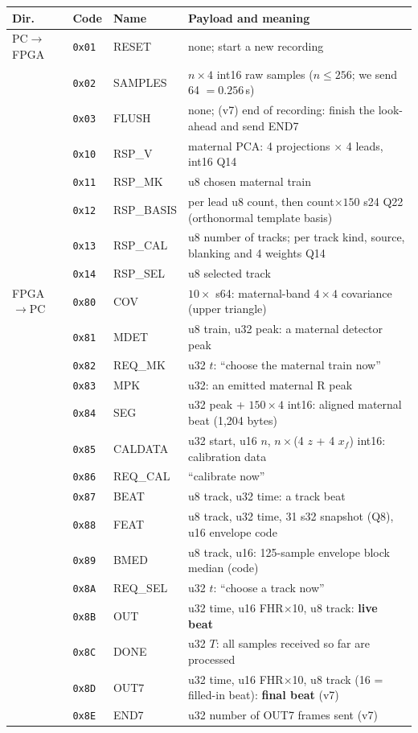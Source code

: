\documentclass[11pt]{article}
\begin{document}
\begin{center}
\small
\begin{longtable}{@{}l l l p{7.2cm}@{}}
\toprule
\textbf{Dir.} & \textbf{Code} & \textbf{Name} & \textbf{Payload and meaning} \\
\midrule
\endhead
PC$\to$FPGA & \texttt{0x01} & RESET & none; start a new recording \\
 & \texttt{0x02} & SAMPLES & $n\times4$ int16 raw samples ($n\le256$; we send 64 $=0.256$\,s) \\
 & \texttt{0x03} & FLUSH & none; (v7) end of recording: finish the look-ahead and send END7 \\
 & \texttt{0x10} & RSP\_V & maternal PCA: 4 projections $\times$ 4 leads, int16 Q14 \\
 & \texttt{0x11} & RSP\_MK & u8 chosen maternal train \\
 & \texttt{0x12} & RSP\_BASIS & per lead u8 count, then count$\times150$ s24 Q22 (orthonormal template basis) \\
 & \texttt{0x13} & RSP\_CAL & u8 number of tracks; per track kind, source, blanking and 4 weights Q14 \\
 & \texttt{0x14} & RSP\_SEL & u8 selected track \\
\midrule
FPGA$\to$PC & \texttt{0x80} & COV & $10\times$ s64: maternal-band $4\times4$ covariance (upper triangle) \\
 & \texttt{0x81} & MDET & u8 train, u32 peak: a maternal detector peak \\
 & \texttt{0x82} & REQ\_MK & u32 $t$: ``choose the maternal train now'' \\
 & \texttt{0x83} & MPK & u32: an emitted maternal R peak \\
 & \texttt{0x84} & SEG & u32 peak + $150\times4$ int16: aligned maternal beat (1,204 bytes) \\
 & \texttt{0x85} & CALDATA & u32 start, u16 $n$, $n\times$(4 $z$ + 4 $x_f$) int16: calibration data \\
 & \texttt{0x86} & REQ\_CAL & ``calibrate now'' \\
 & \texttt{0x87} & BEAT & u8 track, u32 time: a track beat \\
 & \texttt{0x88} & FEAT & u8 track, u32 time, 31 s32 snapshot (Q8), u16 envelope code \\
 & \texttt{0x89} & BMED & u8 track, u16: 125-sample envelope block median (code) \\
 & \texttt{0x8A} & REQ\_SEL & u32 $t$: ``choose a track now'' \\
 & \texttt{0x8B} & OUT & u32 time, u16 FHR$\times$10, u8 track: \textbf{live beat} \\
 & \texttt{0x8C} & DONE & u32 $T$: all samples received so far are processed \\
 & \texttt{0x8D} & OUT7 & u32 time, u16 FHR$\times$10, u8 track (16 = filled-in beat): \textbf{final beat} (v7) \\
 & \texttt{0x8E} & END7 & u32 number of OUT7 frames sent (v7) \\
\bottomrule
\end{longtable}
\end{center}
\end{document}
